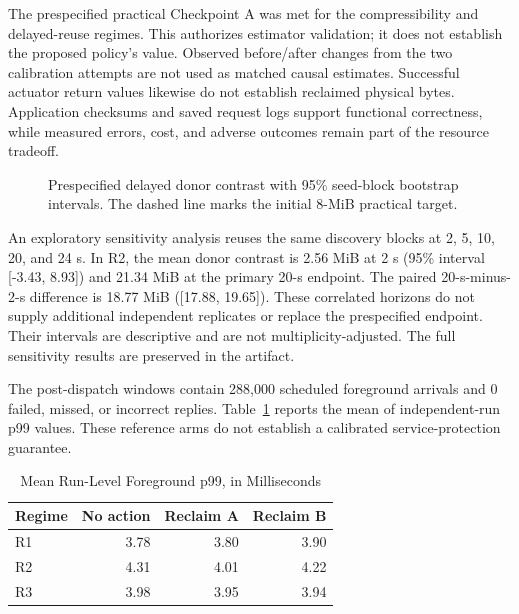 \documentclass[conference]{IEEEtran}
\begin{document}
The prespecified practical Checkpoint A was met for the compressibility and delayed-reuse regimes. This authorizes estimator validation; it does not establish the proposed policy's value.
Observed before/after changes from the two calibration attempts are not used
as matched causal estimates. Successful actuator return values likewise do
not establish reclaimed physical bytes. Application checksums and saved
request logs support functional correctness, while measured errors, cost, and
adverse outcomes remain part of the resource tradeoff.

\begin{figure}[t]
\centering
{}
\caption{Prespecified delayed donor contrast with 95\% seed-block bootstrap
intervals. The dashed line marks the initial 8-MiB practical target.}
\label{fig:gaps}
\end{figure}
An exploratory sensitivity analysis reuses the same discovery blocks at 2, 5, 10, 20, and 24 s. In R2, the mean donor contrast is 2.56 MiB at 2 s (95\% interval [-3.43, 8.93]) and 21.34 MiB at the primary 20-s endpoint. The paired 20-s-minus-2-s difference is 18.77 MiB ([17.88, 19.65]). These correlated horizons do not supply additional independent replicates or replace the prespecified endpoint. Their intervals are descriptive and are not multiplicity-adjusted. The full sensitivity results are preserved in the artifact.

The post-dispatch windows contain 288,000 scheduled foreground arrivals and 0 failed, missed, or incorrect replies. Table~\ref{tab:latency} reports the mean of independent-run p99 values. These reference arms do not establish a calibrated service-protection guarantee.

\begin{table}[t]
\caption{Mean Run-Level Foreground p99, in Milliseconds}
\label{tab:latency}
\centering\small
\begin{tabular}{@{}lrrr@{}}
\toprule
Regime & No action & Reclaim A & Reclaim B \\
\midrule
R1 & 3.78 & 3.80 & 3.90 \\
R2 & 4.31 & 4.01 & 4.22 \\
R3 & 3.98 & 3.95 & 3.94 \\
\bottomrule
\end{tabular}
\end{table}
\end{document}
